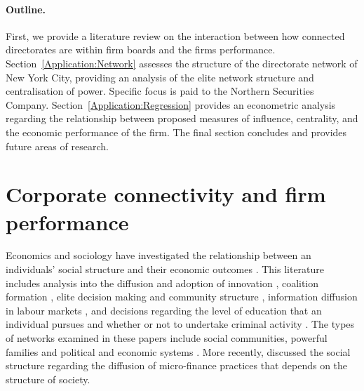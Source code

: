 \documentclass[11pt,fleqn]{article}
\begin{document}
\paragraph{Outline.}

First, we provide a literature review on the interaction between how connected directorates are within firm boards and the firms performance. Section~\ref{Application:Network} assesses the structure of the directorate network of New York City, providing an analysis of the elite network structure and centralisation of power. Specific focus is paid to the Northern Securities Company. Section~\ref{Application:Regression} provides an econometric analysis regarding the relationship between proposed measures of influence, centrality, and the economic performance of the firm. The final section concludes and provides future areas of research.

\section{Corporate connectivity and firm performance} 
\label{Literature}

Economics and sociology have investigated the relationship between an individuals' social structure and their economic outcomes \citep{Granovetter1985}. This literature includes analysis into the diffusion and adoption of innovation \citep{Coleman1966}, coalition formation \citep{Kapferer1969}, elite decision making and community structure \citep{LaumannGalaskiewiczMarsden1978}, information diffusion in labour markets \citep{Granovetter1973}, and decisions regarding the level of education that an individual pursues and whether or not to undertake criminal activity \citep{Jackson2007}. The types of networks examined in these papers include social communities, powerful families and political and economic systems \citep{Padgett1993, Padgett1994}. More recently, \citet{Banerjee2013} discussed the social structure regarding the diffusion of micro-finance practices that depends on the structure of society.
\end{document}
